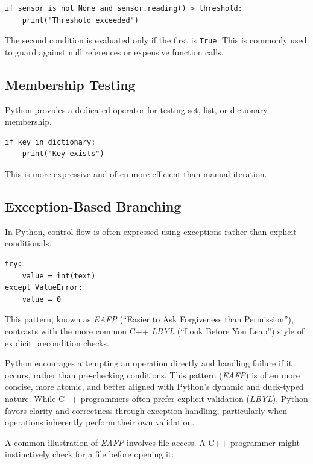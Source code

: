 \begin{verbatim}
if sensor is not None and sensor.reading() > threshold:
    print("Threshold exceeded")
\end{verbatim}

The second condition is evaluated only if the first is \texttt{True}. This is commonly used to guard against null references or expensive function calls.

\subsection{Membership Testing}

Python provides a dedicated operator for testing set, list, or dictionary membership.

\begin{verbatim}
if key in dictionary:
    print("Key exists")
\end{verbatim}

This is more expressive and often more efficient than manual iteration.

\subsection{Exception-Based Branching}

In Python, control flow is often expressed using exceptions rather than explicit conditionals.

\begin{verbatim}
try:
    value = int(text)
except ValueError:
    value = 0
\end{verbatim}

This pattern, known as \emph{EAFP} (``Easier to Ask Forgiveness than Permission''), contrasts with the more common C++ \emph{LBYL} (``Look Before You Leap'') style of explicit precondition checks.

Python encourages attempting an operation directly and handling failure if it occurs, rather than pre-checking conditions. This pattern (\emph{EAFP}) is often more concise, more atomic, and better aligned with Python’s dynamic and duck-typed nature. While C++ programmers often prefer explicit validation (\emph{LBYL}), Python favors clarity and correctness through exception handling, particularly when operations inherently perform their own validation.

A common illustration of \emph{EAFP} involves file access. A C++ programmer might instinctively check for a file before opening it:

